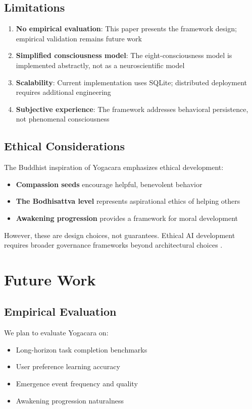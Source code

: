 \documentclass[11pt, a4paper]{article}
\begin{document}
\subsection{Limitations}

\begin{enumerate}
    \item \textbf{No empirical evaluation}: This paper presents the framework design; empirical validation remains future work
    \item \textbf{Simplified consciousness model}: The eight-consciousness model is implemented abstractly, not as a neuroscientific model
    \item \textbf{Scalability}: Current implementation uses SQLite; distributed deployment requires additional engineering
    \item \textbf{Subjective experience}: The framework addresses behavioral persistence, not phenomenal consciousness
\end{enumerate}

\subsection{Ethical Considerations}

The Buddhist inspiration of Yogacara emphasizes ethical development:

\begin{itemize}
    \item \textbf{Compassion seeds} encourage helpful, benevolent behavior
    \item \textbf{The Bodhisattva level} represents aspirational ethics of helping others
    \item \textbf{Awakening progression} provides a framework for moral development
\end{itemize}

However, these are design choices, not guarantees. Ethical AI development requires broader governance frameworks beyond architectural choices \cite{Huang2026}.

\section{Future Work}

\subsection{Empirical Evaluation}

We plan to evaluate Yogacara on:
\begin{itemize}
    \item Long-horizon task completion benchmarks
    \item User preference learning accuracy
    \item Emergence event frequency and quality
    \item Awakening progression naturalness
\end{itemize}
\end{document}

